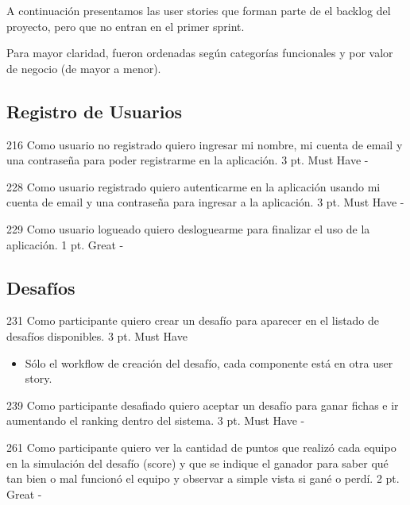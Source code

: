 A continuación presentamos las user stories que forman parte de el backlog del proyecto, pero que no entran en el primer sprint.

Para mayor claridad, fueron ordenadas según categorías funcionales y por valor de negocio (de mayor a menor).

\subsection{Registro de Usuarios}

\simplestory
{216}
{Como usuario no registrado quiero ingresar mi nombre, mi cuenta de email y una contraseña para poder registrarme en la aplicación.}
{3 pt.}
{Must Have}
{-}

\vspace{1cm}

\simplestory
{228}
{Como usuario registrado quiero autenticarme en la aplicación usando mi cuenta de email y una contraseña para ingresar a la aplicación.}
{3 pt.}
{Must Have}
{-}

\vspace{1cm}

\simplestory
{229}
{Como usuario logueado quiero desloguearme para finalizar el uso de la aplicación.}
{1 pt.}
{Great}
{-}

\vspace{1cm}

\subsection{Desaf\'ios}

\simplestory
{231}
{Como participante quiero crear un desafío para aparecer en el listado de desafíos disponibles.}
{3 pt.}
{Must Have}
{\begin{itemize}
\item Sólo el workflow de creación del desafío, cada componente está en otra user story.
\end{itemize}}

\vspace{1cm}

\simplestory
{239}
{Como participante desafiado quiero aceptar un desafío para ganar fichas e ir aumentando el ranking dentro del sistema.}
{3 pt.}
{Must Have}
{-}

\vspace{1cm}

\simplestory
{261}
{Como participante quiero ver la cantidad de puntos que realizó cada equipo en la simulación del desafío (score) y que se indique el ganador para saber qué tan bien o mal funcionó el equipo y observar a simple vista si gané o perdí.
}
{2 pt.}
{Great}
{-}


